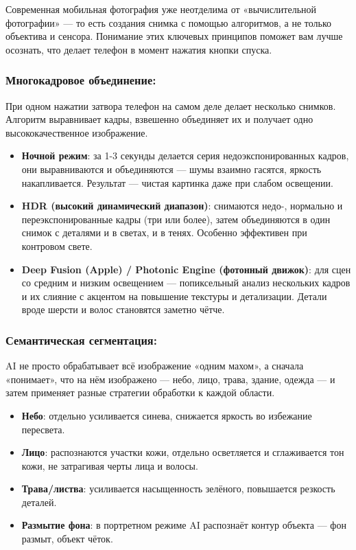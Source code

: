 
Современная мобильная фотография уже неотделима от «вычислительной фотографии» — то есть создания снимка с помощью алгоритмов, а не только объектива и сенсора. Понимание этих ключевых принципов поможет вам лучше осознать, что делает телефон в момент нажатия кнопки спуска.

\subsubsection*{Многокадровое объединение:}

При одном нажатии затвора телефон на самом деле делает несколько снимков. Алгоритм выравнивает кадры, взвешенно объединяет их и получает одно высококачественное изображение.

\begin{itemize}
  \item \textbf{Ночной режим}: за 1-3 секунды делается серия недоэкспонированных кадров, они выравниваются и объединяются — шумы взаимно гасятся, яркость накапливается. Результат — чистая картинка даже при слабом освещении.
  \item \textbf{HDR (высокий динамический диапазон)}: снимаются недо-, нормально и переэкспонированные кадры (три или более), затем объединяются в один снимок с деталями и в светах, и в тенях. Особенно эффективен при контровом свете.
  \item \textbf{Deep Fusion (Apple) / Photonic Engine (фотонный движок)}: для сцен со средним и низким освещением — попиксельный анализ нескольких кадров и их слияние с акцентом на повышение текстуры и детализации. Детали вроде шерсти и волос становятся заметно чётче.
\end{itemize}

\subsubsection*{Семантическая сегментация:}

AI не просто обрабатывает всё изображение «одним махом», а сначала «понимает», что на нём изображено — небо, лицо, трава, здание, одежда — и затем применяет разные стратегии обработки к каждой области.

\begin{itemize}
  \item \textbf{Небо}: отдельно усиливается синева, снижается яркость во избежание пересвета.
  \item \textbf{Лицо}: распознаются участки кожи, отдельно осветляется и сглаживается тон кожи, не затрагивая черты лица и волосы.
  \item \textbf{Трава/листва}: усиливается насыщенность зелёного, повышается резкость деталей.
  \item \textbf{Размытие фона}: в портретном режиме AI распознаёт контур объекта — фон размыт, объект чёток.
\end{itemize}


